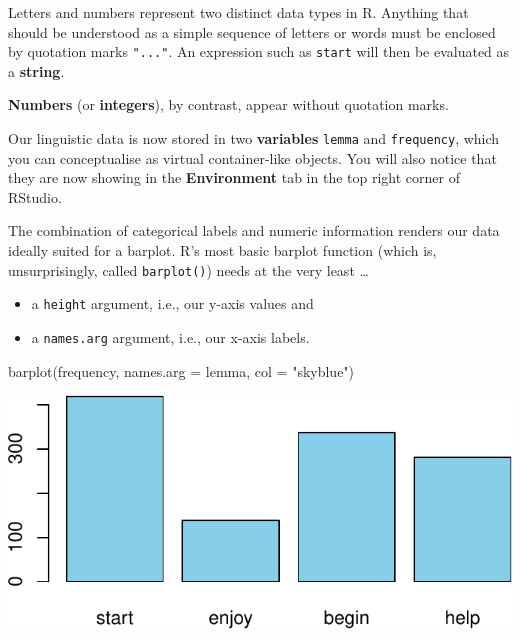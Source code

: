 \documentclass[
  11pt,
  letterpaper,
  DIV=11,
  numbers=noendperiod]{scrreprt}
\newenvironment{Shaded}{\begin{snugshade}}{\end{snugshade}}
\newcommand{\AttributeTok}[1]{\textcolor[rgb]{0.40,0.45,0.13}{#1}}
\newcommand{\FunctionTok}[1]{\textcolor[rgb]{0.28,0.35,0.67}{#1}}
\newcommand{\NormalTok}[1]{\textcolor[rgb]{0.00,0.23,0.31}{#1}}
\newcommand{\StringTok}[1]{\textcolor[rgb]{0.13,0.47,0.30}{#1}}
\begin{document}
\begin{tcolorbox}[enhanced jigsaw, toprule=.15mm, opacitybacktitle=0.6, coltitle=black, arc=.35mm, colback=white, title=\textcolor{quarto-callout-tip-color}{\faLightbulb}\hspace{0.5em}{When do I use quotation marks?}, titlerule=0mm, toptitle=1mm, bottomtitle=1mm, breakable, rightrule=.15mm, opacityback=0, bottomrule=.15mm, leftrule=.75mm, colframe=quarto-callout-tip-color-frame, left=2mm, colbacktitle=quarto-callout-tip-color!10!white]

Letters and numbers represent two distinct data types in R. Anything
that should be understood as a simple sequence of letters or words must
be enclosed by quotation marks \texttt{"..."}. An expression such as
\texttt{start} will then be evaluated as a \textbf{string}.

\textbf{Numbers} (or \textbf{integers}), by contrast, appear without
quotation marks.

\end{tcolorbox}

Our linguistic data is now stored in two \textbf{variables}
\texttt{lemma} and \texttt{frequency}, which you can conceptualise as
virtual container-like objects. You will also notice that they are now
showing in the \textbf{Environment} tab in the top right corner of
RStudio.

The combination of categorical labels and numeric information renders
our data ideally suited for a barplot. R's most basic barplot function
(which is, unsurprisingly, called \texttt{barplot()}) needs at the very
least \ldots{}

\begin{itemize}
\item
  a \texttt{height} argument, i.e., our y-axis values and
\item
  a \texttt{names.arg} argument, i.e., our x-axis labels.
\end{itemize}

\begin{Shaded}
\begin{Highlighting}[]
\FunctionTok{barplot}\NormalTok{(frequency, }\AttributeTok{names.arg =}\NormalTok{ lemma, }\AttributeTok{col =} \StringTok{"skyblue"}\NormalTok{)}
\end{Highlighting}
\end{Shaded}

\includegraphics{Vectors_Factors_files/figure-pdf/unnamed-chunk-3-1.pdf}
\end{document}
